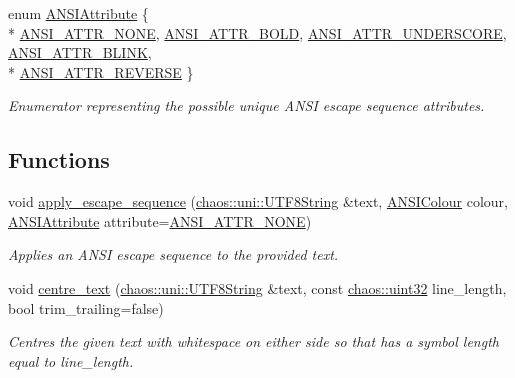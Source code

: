 \begin{DoxyCompactItemize}
enum \hyperlink{namespacechaos_1_1io_1_1format_af01119682ec0bc616b49641e0c2a7ccf}{A\-N\-S\-I\-Attribute} \{ \\*
\hyperlink{namespacechaos_1_1io_1_1format_af01119682ec0bc616b49641e0c2a7ccfa3154b286513beb167bb516ea15f1cfb5}{A\-N\-S\-I\-\_\-\-A\-T\-T\-R\-\_\-\-N\-O\-N\-E}, 
\hyperlink{namespacechaos_1_1io_1_1format_af01119682ec0bc616b49641e0c2a7ccfaada31e77e1e80ea78e0cd08a126271b3}{A\-N\-S\-I\-\_\-\-A\-T\-T\-R\-\_\-\-B\-O\-L\-D}, 
\hyperlink{namespacechaos_1_1io_1_1format_af01119682ec0bc616b49641e0c2a7ccfa2f1d142ccf489cba5710445abd48555f}{A\-N\-S\-I\-\_\-\-A\-T\-T\-R\-\_\-\-U\-N\-D\-E\-R\-S\-C\-O\-R\-E}, 
\hyperlink{namespacechaos_1_1io_1_1format_af01119682ec0bc616b49641e0c2a7ccfacd3671458d96396a0fec66c993244186}{A\-N\-S\-I\-\_\-\-A\-T\-T\-R\-\_\-\-B\-L\-I\-N\-K}, 
\\*
\hyperlink{namespacechaos_1_1io_1_1format_af01119682ec0bc616b49641e0c2a7ccfaa7b58f4c0365d47d2bc98a4587521806}{A\-N\-S\-I\-\_\-\-A\-T\-T\-R\-\_\-\-R\-E\-V\-E\-R\-S\-E}
 \}
\begin{DoxyCompactList}\small\item\em Enumerator representing the possible unique A\-N\-S\-I escape sequence attributes. \end{DoxyCompactList}\end{DoxyCompactItemize}
\subsection*{Functions}
\begin{DoxyCompactItemize}
\item 
void \hyperlink{namespacechaos_1_1io_1_1format_ae9aebf86c855cb5ed332902264a507b7}{apply\-\_\-escape\-\_\-sequence} (\hyperlink{classchaos_1_1uni_1_1_u_t_f8_string}{chaos\-::uni\-::\-U\-T\-F8\-String} \&text, \hyperlink{namespacechaos_1_1io_1_1format_aa30dcff2478ffc94e33504c8886a5b1a}{A\-N\-S\-I\-Colour} colour, \hyperlink{namespacechaos_1_1io_1_1format_af01119682ec0bc616b49641e0c2a7ccf}{A\-N\-S\-I\-Attribute} attribute=\hyperlink{namespacechaos_1_1io_1_1format_af01119682ec0bc616b49641e0c2a7ccfa3154b286513beb167bb516ea15f1cfb5}{A\-N\-S\-I\-\_\-\-A\-T\-T\-R\-\_\-\-N\-O\-N\-E})
\begin{DoxyCompactList}\small\item\em Applies an A\-N\-S\-I escape sequence to the provided text. \end{DoxyCompactList}\item 
void \hyperlink{namespacechaos_1_1io_1_1format_ac53c87508bb81f6fc26efd9bfca7b027}{centre\-\_\-text} (\hyperlink{classchaos_1_1uni_1_1_u_t_f8_string}{chaos\-::uni\-::\-U\-T\-F8\-String} \&text, const \hyperlink{namespacechaos_a3b3a47ba1e284655bf1a30c441121c60}{chaos\-::uint32} line\-\_\-length, bool trim\-\_\-trailing=false)
\begin{DoxyCompactList}\small\item\em Centres the given text with whitespace on either side so that has a symbol length equal to line\-\_\-length. \end{DoxyCompactList}\end{DoxyCompactItemize}


